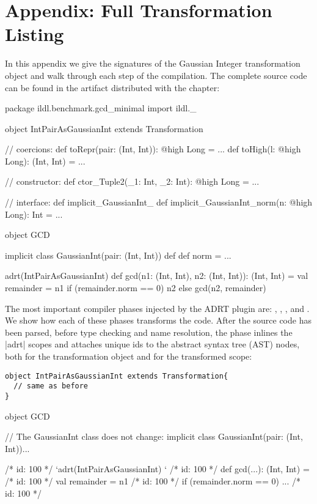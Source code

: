 \section{Appendix: Full Transformation Listing}

In this appendix we give the signatures of the Gaussian Integer transformation object and walk through each step of the compilation. The complete source code can be found in the artifact distributed with the chapter:

\begin{lstlisting-nobreak}
package ildl.benchmark.gcd_minimal
import ildl._

object IntPairAsGaussianInt extends Transformation{
  // coercions:
  def toRepr(pair: (Int, Int)): @high Long = ...
  def toHigh(l: @high Long): (Int, Int) = ...

  // constructor:
  def ctor_Tuple2(_1: Int, _2: Int): @high Long = ...

  // interface:
  def implicit_GaussianInt_%
  def implicit_GaussianInt_norm(n: @high Long): Int = ...
}
object GCD {
  implicit class GaussianInt(pair: (Int, Int)) {
    def %
    def norm = ...
  }

  adrt(IntPairAsGaussianInt) {
    def gcd(n1: (Int, Int), n2: (Int, Int)): (Int, Int) = {
      val remainder = n1 %
      if (remainder.norm == 0) n2 else gcd(n2, remainder)
    }
  }
}
\end{lstlisting-nobreak}

The most important compiler phases injected by the ADRT plugin are: \postparser{}, \inject{}, \bridge{}, \coerce{} and \commit{}. We show how each of these phases transforms the code. After the source code has been parsed, before type checking and name resolution, the \postparser{} phase inlines the |adrt| scopes and attaches unique ids to the abstract syntax tree (AST) nodes, both for the transformation object and for the transformed scope:


\begin{lstlisting}
object IntPairAsGaussianInt extends Transformation{
  // same as before
}
\end{lstlisting}

\begin{lstlisting-nobreak}
object GCD {
  // The GaussianInt class does not change:
  implicit class GaussianInt(pair: (Int, Int))...

  /* id: 100 */ `adrt(IntPairAsGaussianInt) {}`
  /* id: 100 */ def gcd(...): (Int, Int) = {
  /* id: 100 */        val remainder = n1 %
  /* id: 100 */        if (remainder.norm == 0) ...
  /* id: 100 */ }
}
\end{lstlisting-nobreak}

